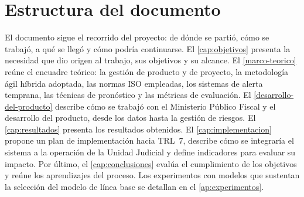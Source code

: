 \section{Estructura del documento}\label{sec:estructura-documento}

El documento sigue el recorrido del proyecto: de dónde se partió, cómo se trabajó, a qué se llegó y cómo podría continuarse. El \cref{cap:objetivos} presenta la necesidad que dio origen al trabajo, sus objetivos y su alcance. El \cref{marco-teorico} reúne el encuadre teórico: la gestión de producto y de proyecto, la metodología ágil híbrida adoptada, las normas ISO empleadas, los sistemas de alerta temprana, las técnicas de pronóstico y las métricas de evaluación. El \cref{desarrollo-del-producto} describe cómo se trabajó con el Ministerio Público Fiscal y el desarrollo del producto, desde los datos hasta la gestión de riesgos. El \cref{cap:resultados} presenta los resultados obtenidos. El \cref{cap:implementacion} propone un plan de implementación hacia TRL~7, describe cómo se integraría el sistema a la operación de la Unidad Judicial y define indicadores para evaluar su impacto. Por último, el \cref{cap:conclusiones} evalúa el cumplimiento de los objetivos y reúne los aprendizajes del proceso. Los experimentos con modelos que sustentan la selección del modelo de línea base se detallan en el \cref{ap:experimentos}.
